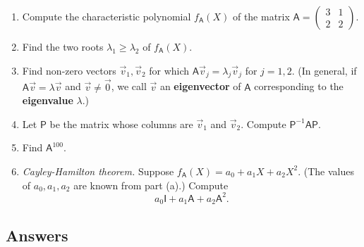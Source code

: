 \begin{enumerate}
\begin{equation*}
\end{equation*}
\begin{enumerate}
\item Compute the characteristic polynomial $f_{\mathsf{A}}(X)$ of the matrix $\mathsf{A} = \begin{pmatrix} 3 & 1 \\ 2 & 2 \end{pmatrix}$.
\item Find the two roots $\lambda_1\geq\lambda_2$ of $f_{\mathsf{A}}(X)$.
\item Find non-zero vectors $\vec{v}_1,\vec{v}_2$ for which $\mathsf{A}\vec{v}_j = \lambda_j\vec{v}_j$ for $j = 1,2$. (In general, if $\mathsf{A}\vec{v} = \lambda\vec{v}$ and $\vec{v}\neq\vec{0}$, we call $\vec{v}$ an \textbf{eigenvector} of $\mathsf{A}$ corresponding to the \textbf{eigenvalue} $\lambda$.)
\item Let $\mathsf{P}$ be the matrix whose columns are $\vec{v}_1$ and $\vec{v}_2$. Compute $\mathsf{P}^{-1}\mathsf{AP}$.
\item Find $\mathsf{A}^{100}$.
\item \emph{Cayley-Hamilton theorem.} Suppose $f_{\mathsf{A}}(X) = a_0 + a_1X + a_2X^2$. (The values of $a_0, a_1, a_2$ are known from part (a).) Compute
\begin{equation*}
a_0\mathsf{I} + a_1\mathsf{A} + a_2\mathsf{A}^2.
\end{equation*}
\end{enumerate}
\end{enumerate}


\newpage
\subsection{Answers}

